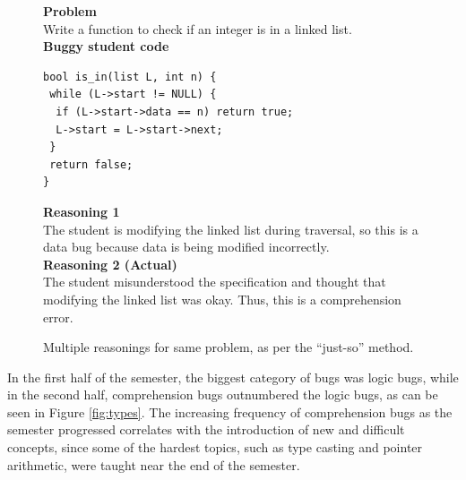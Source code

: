 \documentclass{sig-alternate}
\begin{document}
\begin{figure}
\begin{framed}
\setlength{\parindent}{0cm}
\textbf{Problem}\\
Write a function to check if an integer is in a linked list.\\

\textbf{Buggy student code}
\vspace{-0.05in}
\begin{verbatim}
bool is_in(list L, int n) {
 while (L->start != NULL) {
  if (L->start->data == n) return true;
  L->start = L->start->next;
 }
 return false;
}
\end{verbatim}

\textbf{Reasoning 1}\\

The student is modifying the linked list during traversal, so this is
a data bug because data is being modified incorrectly.\\

\textbf{Reasoning 2 (Actual)}\\

The student misunderstood the specification and thought that modifying
the linked list was okay. Thus, this is a comprehension error.

\end{framed}
\vspace{-0.1in}
\caption{Multiple reasonings for same problem, as per the ``just-so'' method.}
\label{fig:incorrect}
\end{figure}


In the first half of the semester, the biggest category of bugs was
logic bugs, while in the second half, comprehension bugs outnumbered the
logic bugs, as can be seen in Figure \ref{fig:types}. The increasing
frequency of comprehension bugs as the semester progressed correlates
with the introduction of new and difficult concepts, since some of the
hardest topics, such as type casting and pointer arithmetic, were
taught near the end of the semester.\\
\end{document}
